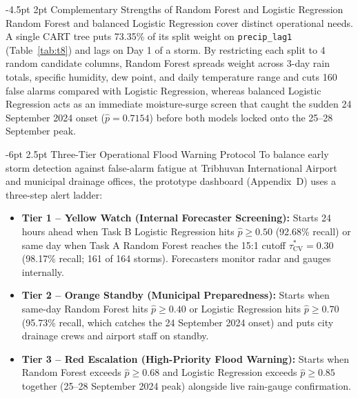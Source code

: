\documentclass[10pt,twocolumn,a4paper]{article}
\makeatletter
\renewcommand{\subsection}{\@startsection{subsection}{2}{\z@}%
  {-6pt \@plus -1.5pt \@minus -0.5pt}%
  {2.5pt \@plus 0.5pt}%
  {\normalfont\normalsize\bfseries\itshape}}
\renewcommand{\subsubsection}{\@startsection{subsubsection}{3}{0.5em}%
  {-4.5pt \@plus -1pt \@minus -0.5pt}%
  {2pt \@plus 0.5pt}%
  {\normalfont\normalsize\bfseries\itshape}}
\makeatother
\begin{document}
\subsubsection{Complementary Strengths of Random Forest and Logistic Regression}
Random Forest and balanced Logistic Regression cover distinct operational needs. A single CART tree puts 73.35\% of its split weight on \texttt{precip\_lag1} (Table~\ref{tab:t8}) and lags on Day 1 of a storm. By restricting each split to 4 random candidate columns, Random Forest spreads weight across 3-day rain totals, specific humidity, dew point, and daily temperature range and cuts 160 false alarms compared with Logistic Regression, whereas balanced Logistic Regression acts as an immediate moisture-surge screen that caught the sudden 24 September 2024 onset ($\hat{p} = 0.7154$) before both models locked onto the 25--28 September peak.

\subsection{Three-Tier Operational Flood Warning Protocol}
To balance early storm detection against false-alarm fatigue at Tribhuvan International Airport and municipal drainage offices, the prototype dashboard (Appendix~D) uses a three-step alert ladder:
\begin{itemize}
  \setlength{\itemsep}{1.5pt}\setlength{\parskip}{0pt}
  \item \textbf{Tier 1 -- Yellow Watch (Internal Forecaster Screening):} Starts 24 hours ahead when Task B Logistic Regression hits $\hat{p} \ge 0.50$ (92.68\% recall) or same day when Task A Random Forest reaches the 15:1 cutoff $\tau^*_{\text{CV}} = 0.30$ (98.17\% recall; 161 of 164 storms). Forecasters monitor radar and gauges internally.
  \item \textbf{Tier 2 -- Orange Standby (Municipal Preparedness):} Starts when same-day Random Forest hits $\hat{p} \ge 0.40$ or Logistic Regression hits $\hat{p} \ge 0.70$ (95.73\% recall, which catches the 24 September 2024 onset) and puts city drainage crews and airport staff on standby.
  \item \textbf{Tier 3 -- Red Escalation (High-Priority Flood Warning):} Starts when Random Forest exceeds $\hat{p} \ge 0.68$ and Logistic Regression exceeds $\hat{p} \ge 0.85$ together (25--28 September 2024 peak) alongside live rain-gauge confirmation.
\end{itemize}
\end{document}
